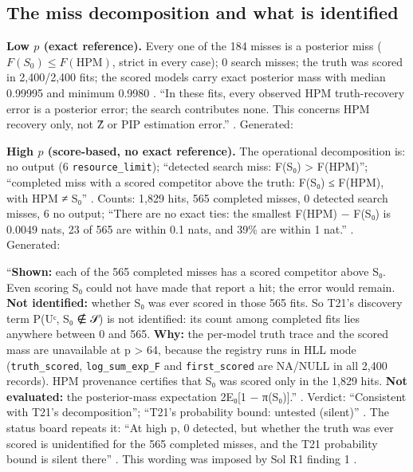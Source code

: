 \subsection{The miss decomposition and what is identified}\label{sec:emp-miss}

\textbf{Low $p$ (exact reference).} Every one of the 184 misses is a posterior miss ($F(S_0)\le F(\text{HPM})$, strict in every case);
0 search misses; the truth was scored in 2,400/2,400 fits; the scored models carry exact posterior mass with median 0.99995 and
minimum 0.9980 . ``In these fits, every observed HPM
truth-recovery error is a posterior error; the search contributes none. This concerns HPM recovery only, not Ẑ or PIP estimation
error.'' . Generated:


\textbf{High $p$ (score-based, no exact reference).}  The operational decomposition is: no output (6
\texttt{resource\_limit}); ``detected search miss: F(S₀) > F(HPM)''; ``completed miss with a scored competitor above the truth:
F(S₀) ≤ F(HPM), with HPM ≠ S₀'' . Counts: 1,829 hits, 565
completed misses, 0 detected search misses, 6 no output; ``There are no exact ties: the smallest F(HPM) − F(S₀) is 0.0049 nats, 23 of
565 are within 0.1 nats, and 39\% are within 1 nat.'' .
Generated:


\begin{notproved}
``\textbf{Shown:} each of the 565 completed misses has a scored competitor above S₀. Even scoring S₀ could not have made that
report a hit; the error would remain. \textbf{Not identified:} whether S₀ was ever scored in those 565 fits. So T21's discovery term
P(Uᶜ, S₀ ∉ 𝒮) is not identified: its count among completed fits lies anywhere between 0 and 565. \textbf{Why:} the per-model
truth trace and the scored mass are unavailable at p > 64, because the registry runs in HLL mode (\texttt{truth\_scored},
\texttt{log\_sum\_exp\_F} and \texttt{first\_scored} are NA/NULL in all 2,400 records). HPM provenance certifies that S₀ was scored
only in the 1,829 hits. \textbf{Not evaluated:} the posterior-mass expectation 2E₀[1 − π(S₀)].''
. Verdict: ``Consistent with T21's decomposition'';
``T21's probability bound: untested (silent)'' . The status
board repeats it: ``At high p, 0 detected, but whether the truth was ever scored is unidentified for the 565 completed misses, and
the T21 probability bound is silent there'' . This wording was imposed by Sol R1 finding 1
.
\end{notproved}

